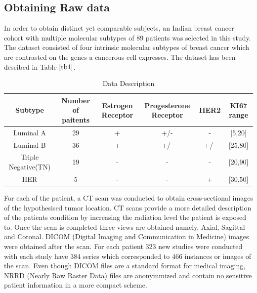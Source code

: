 \documentclass[final,1p,times,twocolumn]{elsarticle}
\begin{document}
\subsection{Obtaining Raw data}

In order to obtain distinct yet comparable subjects, an Indian breast cancer cohort with multiple molecular subtypes of 89 patients was selected in this study. The dataset consisted of four intrinsic molecular subtypes of breast cancer which are contrasted on the genes a cancerous cell expresses. The dataset has been descibed in Table $\ref{tb1}$.

\begin{table}[!b]
\scriptsize
\centering
\caption{Data Description}
\label{tb1}
\begin{tabular}{| c | c | c | c | c | c |}
\hline
\textbf{Subtype} & \textbf{Number of paitents} & \textbf{Estrogen Receptor} & \textbf{Progesterone Receptor} & \textbf{HER2} & \textbf{KI67 range}\\
\hline
Luminal A & 29 & + & +/- & - & [5,20] \\
Luminal B & 36 & + & +/- & +/- & [25,80] \\
Triple Negative(TN) & 19 & - & - & - & [20,90] \\
HER & 5 & - & - & + & [30,50]\\
\hline
\end{tabular}
\end{table}

For each of the patient, a CT scan was conducted to obtain cross-sectional images of the hypothesised tumor location. CT scans provide a more detailed description of the patients condition by increasing the radiation level the patient is exposed to. Once the scan is completed three views are obtained namely, Axial, Sagittal and Coronal. DICOM (Digital Imaging and Communication in Medicine) images were obtained after the scan. For each patient 323 new studies were conducted with each study have 384 series which corresponded to 466 instances or images of the scan. Even though DICOM files are a standard format for medical imaging, NRRD (Nearly Raw Raster Data) files are anonymmized and contain no sensitive patient information in a more compact scheme. 

\end{document}
